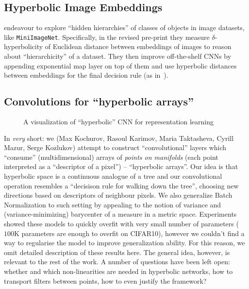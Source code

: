 \subsection*{Hyperbolic Image Embeddings}

\citet{khrulkov} endeavour to explore ``hidden hierarchies'' of classes of
objects in image datasets, like \texttt{MiniImageNet}. Specifically, in the
revised pre-print they measure \( \delta \)-hyperbolicity of Euclidean distance
between embeddings of images to reason about ``hierarchicity'' of a dataset.
They then improve off-the-shelf CNNs by appending exponential map layer on top
of them and use hyperbolic distances between embeddings for the final
decision rule (as in~\citet{snell2017protonet}).

\subsection{Convolutions for ``hyperbolic arrays''} \label{sec:hconv}

\begin{figure}[ht]\center
{}
\caption{A visualization of ``hyperbolic'' CNN for representation learning}
\end{figure}

In \emph{very} short: we (Max Kochurov, Rasoul Karimov, Maria Taktasheva,
Cyrill Mazur, Serge Kozlukov) attempt to construct ``convolutional'' layers
which ``consume'' (multidimensional) arrays of \emph{points on manifolds} (each
point interpreted as a ``descriptor of a pixel'') -- ``hyperbolic arrays''. Our
idea is that hyperbolic space is a continuous analogue of a tree and our
convolutional operation resembles a ``decisison rule for walking down the
tree'', choosing new directions based on descriptors of neighbour pixels. We
also generalize Batch Normalization to such setting by appealing to the notion
of variance and (variance-minimizing) barycenter of a measure in a metric
space. Experiments showed these models to quickly overfit with very small number
of parameters (\( 100 \)K parameters are enough to overfit on CIFAR10),
however we couldn't find a way to regularise the model to improve generalization
ability. For this reason, we omit detailed description of these results here.
The general idea, however, is relevant to the rest of the work. A number
of questions have been left open: whether and which non-linearities are needed
in hyperbolic networks, how to transport filters between points, how to even
justify the framework?

